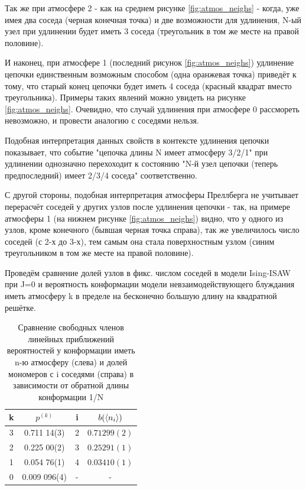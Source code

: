 Так же при атмосфере 2 - как на среднем рисунке \ref{fig:atmos_neighs} - когда, уже имея два соседа (черная конечная точка) и две возможности для удлинения, N-ый узел при удлинении будет иметь 3 соседа (треугольник в том же месте на правой половине). 

И наконец, при атмосфере 1 (последний рисунок \ref{fig:atmos_neighs}) удлинение цепочки единственным возможным способом (одна оранжевая точка) приведёт к тому, что старый конец цепочки будет иметь 4 соседа (красный квадрат вместо треугольника). Примеры таких явлений можно увидеть на рисунке \ref{fig:atmos_neighs}. Очевидно, что случай удлинения при атмосфере 0 рассмореть невозможно, и провести аналогию с соседями нельзя.

Подобная интерпретация данных свойств в контексте удлинения цепочки показывает, что событие "цепочка длины N имеет атмосферу 3/2/1" при удлинении однозначно перехоходит к состоянию "N-й узел цепочки (теперь предпоследний) имеет 2/3/4 соседа" соответственно.

С другой стороны, подобная интерпретация атмосферы Преллберга не учитывает перерасчёт соседей у других узлов после удлинения цепочки - так, на примере атмосферы 1 (на нижнем рисунке \ref{fig:atmos_neighs}) видно, что у одного из узлов, кроме конечного (бывшая черная точка справа), так же увеличилось число соседей (с 2-х до 3-х), тем самым она стала поверхностным узлом (синим треугольником в том же месте на правой половине).

Проведём сравнение долей узлов в фикс. числом соседей в модели Ising-ISAW при J=0 и вероятность конформации модели невзаимодействующего блуждания иметь атмосферу k в пределе на бесконечно большую длину на квадратной решётке. 

\begin{table}[h]
    \centering
    \begin{tabular}{|c|c|c|c|}
    \hline
    k & $p^{(k)}$ & i & $b(\langle n_{i} \rangle)$ \\ \hline
    3 & 0.711 14(3) & 2 & $0.71299(2)$ \\ \hline
    2 & 0.225 00(2) & 3 & $0.25291(1)$ \\ \hline
    1 & 0.054 76(1) & 4 & $0.03410(1)$\\ \hline
    0 & 0.009 096(4) & - & - \\ \hline
    \end{tabular}
    \caption{Сравнение свободных членов линейных приближений вероятностей у конформации иметь n-ю атмосферу (слева) и долей мономеров с i соседями (справа) в зависимости от обратной длины конформации 1/N}
    \label{tab:Prellb_Compare}
\end{table}

